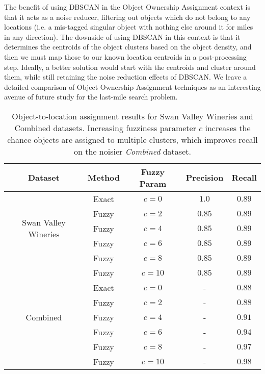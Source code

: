 The benefit of using DBSCAN in the Object Ownership Assignment context is that it acts as a noise reducer, filtering out objects which do not belong to any locations (i.e. a mis-tagged singular object with nothing else around it for miles in any direction). 
The downside of using DBSCAN in this context is that it determines the centroids of the object clusters based on the object density, and then we must map those to our known location centroids in a post-processing step. 
Ideally, a better solution would start with the centroids and cluster around them, while still retaining the noise reduction effects of DBSCAN.
We leave a detailed comparison of Object Ownership Assignment techniques as an interesting avenue of future study for the last-mile search problem.


\small{
\begin{table}[h!]
	\begin{center}
		\begin{tabular}{ |c|c|c|c|c| } 
			\hline
			Dataset & Method & Fuzzy Param & Precision & Recall \\
			\hline
			\multirow{5}{4em}{Swan Valley Wineries} 
                & Exact & $c = 0$ & $1.0$ & $0.89$  \\ 
				& Fuzzy & $c = 2$ & $0.85$ & $0.89$  \\ 
				& Fuzzy & $c = 4$ & $0.85$ & $0.89$  \\
				& Fuzzy & $c = 6$ & $0.85$ & $0.89$  \\ 
				& Fuzzy & $c = 8$ & $0.85$ & $0.89$  \\ 
				& Fuzzy & $c = 10$ & $0.85$ & $0.89$  \\ 
			\hline
			\multirow{5}{4em}{Combined} 
                & Exact & $c = 0$ & - & $0.88$  \\ 
				& Fuzzy & $c = 2$ & - & $0.88$  \\ 
				& Fuzzy & $c = 4$ & - & $0.91$  \\ 
				& Fuzzy & $c = 6$ & - & $0.94$  \\ 
				& Fuzzy & $c = 8$ & - & $0.97$  \\ 
				& Fuzzy & $c = 10$ & - & $0.98$  \\ 
			\hline
		\end{tabular}
		\caption{ Object-to-location assignment results for Swan Valley Wineries and Combined datasets. Increasing fuzziness parameter $c$ increases the chance objects are assigned to multiple clusters, which improves recall on the noisier \textit{Combined} dataset.}
        \label{table:clustering}
	\end{center}
\end{table}
}



